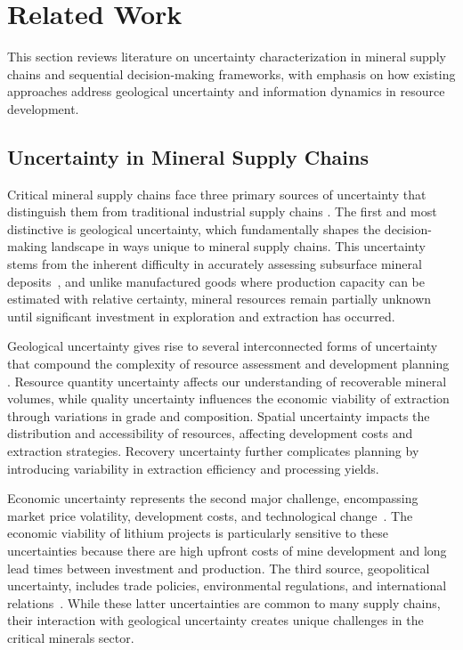 \section{Related Work}
\label{sec:literature_review}

This section reviews literature on uncertainty characterization in mineral supply chains and sequential decision-making frameworks, with emphasis on how existing approaches address geological uncertainty and information dynamics in resource development.

\subsection{Uncertainty in Mineral Supply Chains}

Critical mineral supply chains face three primary sources of uncertainty that distinguish them from traditional industrial supply chains \citep{caers2022efficacy, mcnulty2021barriers}. The first and most distinctive is geological uncertainty, which fundamentally shapes the decision-making landscape in ways unique to mineral supply chains. This uncertainty stems from the inherent difficulty in accurately assessing subsurface mineral deposits~\citep{mern2023intelligent}, and unlike manufactured goods where production capacity can be estimated with relative certainty, mineral resources remain partially unknown until significant investment in exploration and extraction has occurred.

Geological uncertainty gives rise to several interconnected forms of uncertainty that compound the complexity of resource assessment and development planning \citep{caers2022efficacy}. Resource quantity uncertainty affects our understanding of recoverable mineral volumes, while quality uncertainty influences the economic viability of extraction through variations in grade and composition. Spatial uncertainty impacts the distribution and accessibility of resources, affecting development costs and extraction strategies. Recovery uncertainty further complicates planning by introducing variability in extraction efficiency and processing yields.

Economic uncertainty represents the second major challenge, encompassing market price volatility, development costs, and technological change~\citep{hailes2022lithium}. The economic viability of lithium projects is particularly sensitive to these uncertainties because there are high upfront costs of mine development and long lead times between investment and production. The third source, geopolitical uncertainty, includes trade policies, environmental regulations, and international relations~\citep{sanchez2023geopolitics, tian2021features}. While these latter uncertainties are common to many supply chains, their interaction with geological uncertainty creates unique challenges in the critical minerals sector.

